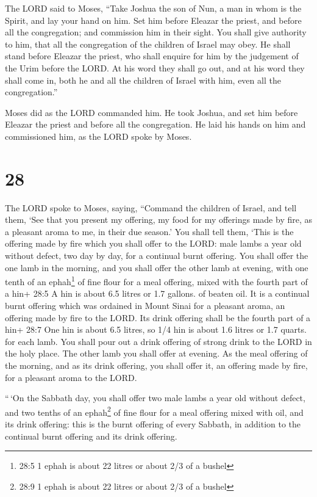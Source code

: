  The LORD said to Moses, ``Take Joshua the son of Nun, a
man in whom is the Spirit, and lay your hand on him.  Set
him before Eleazar the priest, and before all the congregation; and
commission him in their sight.  You shall give authority to
him, that all the congregation of the children of Israel may obey.
 He shall stand before Eleazar the priest, who shall
enquire for him by the judgement of the Urim before the LORD. At his
word they shall go out, and at his word they shall come in, both he and
all the children of Israel with him, even all the congregation.''

 Moses did as the LORD commanded him. He took Joshua, and
set him before Eleazar the priest and before all the congregation.
 He laid his hands on him and commissioned him, as the LORD
spoke by Moses.

\hypertarget{section-27}{%
\section{28}\label{section-27}}

 The LORD spoke to Moses, saying,  ``Command the
children of Israel, and tell them, `See that you present my offering, my
food for my offerings made by fire, as a pleasant aroma to me, in their
due season.'  You shall tell them, `This is the offering
made by fire which you shall offer to the LORD: male lambs a year old
without defect, two day by day, for a continual burnt offering.
 You shall offer the one lamb in the morning, and you shall
offer the other lamb at evening,  with one tenth of an
ephah\footnote{28:5 1 ephah is about 22 litres or about 2/3 of a bushel}
of fine flour for a meal offering, mixed with the fourth part of a hin+
28:5 A hin is about 6.5 litres or 1.7 gallons. of beaten oil.
 It is a continual burnt offering which was ordained in
Mount Sinai for a pleasant aroma, an offering made by fire to the LORD.
 Its drink offering shall be the fourth part of a hin+ 28:7
One hin is about 6.5 litres, so 1/4 hin is about 1.6 litres or 1.7
quarts. for each lamb. You shall pour out a drink offering of strong
drink to the LORD in the holy place.  The other lamb you
shall offer at evening. As the meal offering of the morning, and as its
drink offering, you shall offer it, an offering made by fire, for a
pleasant aroma to the LORD.

 ``\,`On the Sabbath day, you shall offer two male lambs a
year old without defect, and two tenths of an ephah\footnote{28:9 1
  ephah is about 22 litres or about 2/3 of a bushel} of fine flour for a
meal offering mixed with oil, and its drink offering:  this
is the burnt offering of every Sabbath, in addition to the continual
burnt offering and its drink offering.

